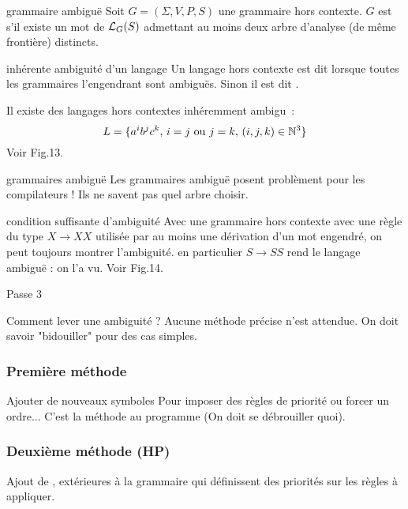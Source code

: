 \begin{adjustwidth}{-3cm}{-3cm}
\begin{definition}{}{grammaire ambiguë}
    Soit $G = (\Sigma, V,P,S)$ une grammaire hors contexte. $G$ est  s'il existe un mot de $\mathcal{L}_{G}(S)$ admettant au moins deux arbre d'analyse (de même frontière) distincts.
\end{definition}

\begin{definition}{}{inhérente ambiguité d'un langage}
    Un langage hors contexte est dit  lorsque toutes les grammaires l'engendrant sont ambiguës. Sinon il est dit .
\end{definition}

\begin{remarque}{}{}
    Il existe des langages hors contextes inhéremment ambigu~: 
    $$L = \{a^ib^jc^k,\, i=j \text{ ou } j=k,\, (i,j,k)\in \mathbb{N}^3\}$$
    Voir Fig.13.
\end{remarque}

\begin{remarque}{}{grammaires ambiguë}
    Les grammaires ambiguë posent problèment pour les compilateurs ! Ils ne savent pas quel arbre choisir.
\end{remarque}

\begin{remarque}{}{condition suffisante d'ambiguité}
    Avec une grammaire hors contexte avec une règle du type $X \rightarrow XX$ utilisée par au moins une dérivation d'un mot engendré, on peut toujours montrer l'ambiguité. en particulier $S \rightarrow SS$ rend le langage ambiguë : on l'a vu. Voir Fig.14.
\end{remarque}
Passe 3


Comment lever une ambiguité ?
Aucune méthode précise n'est attendue. On doit savoir "bidouiller" pour des cas simples.

\subsubsection{Première méthode}

Ajouter de nouveaux symboles Pour imposer des règles de priorité ou forcer un ordre... C'est la méthode au programme (On doit se débrouiller quoi).

\subsubsection{Deuxième méthode (HP)}
Ajout de , extérieures à la grammaire qui définissent des priorités sur les règles à appliquer.\\


\end{adjustwidth}
